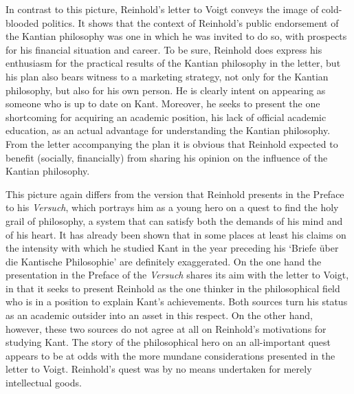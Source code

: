  In contrast to this picture, Reinhold's letter to Voigt conveys the image of cold{-}blooded politics. It shows that the context of Reinhold's public endorsement of the Kantian philosophy was one in which he was invited to do so, with prospects for his financial situation and career. To be sure, Reinhold does express his enthusiasm for the practical results of the Kantian philosophy in the letter, but his plan also bears witness to a marketing strategy, not only for the Kantian philosophy, but also for his own person. He is clearly intent on appearing as someone who is up to date on Kant. Moreover, he seeks to present the one shortcoming for acquiring an academic position, his lack of official academic education, as an actual advantage for understanding the Kantian philosophy. From the letter accompanying the plan it is obvious that Reinhold expected to benefit (socially, financially) from sharing his opinion on the influence of the Kantian philosophy. 

 This picture again differs from the version that Reinhold presents in the Preface to his \textit{Versuch}, which portrays him as a young hero on a quest to find the holy grail of philosophy, a system that can satisfy both the demands of his mind and of his heart. It has already been shown that in some places at least his claims on the intensity with which he studied Kant in the year preceding his `Briefe \"{u}ber die Kantische Philosophie' are definitely exaggerated. On the one hand the presentation in the Preface of the \textit{Versuch} shares its aim with the letter to Voigt, in that it seeks to present Reinhold as the one thinker in the philosophical field who is in a position to explain Kant's achievements. Both sources turn his status as an academic outsider into an asset in this respect. On the other hand, however, these two sources do not agree at all on Reinhold's motivations for studying Kant. The story of the philosophical hero on an all{-}important quest appears to be at odds with the more mundane considerations presented in the letter to Voigt. Reinhold's quest was by no means undertaken for merely intellectual goods. 

